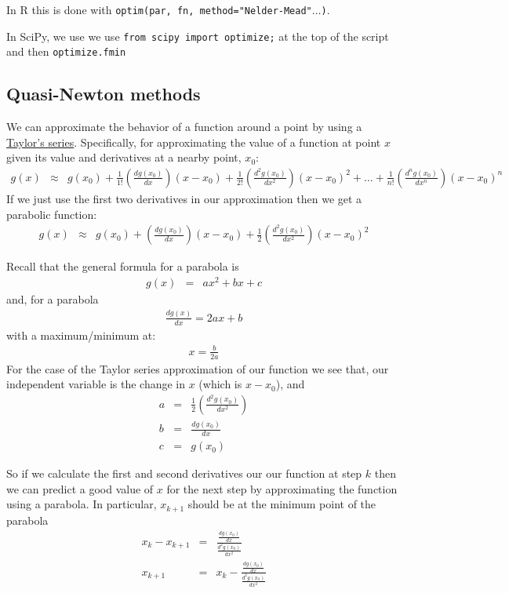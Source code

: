 \documentclass[11pt]{article}
\begin{document}
In R this is done with {\tt optim(par, fn, method="Nelder-Mead"$\ldots$)}.

In SciPy, we use we use {\tt from scipy import optimize;} at the top of the script and then {\tt optimize.fmin}

\subsection*{Quasi-Newton methods}

We can approximate the behavior of a function around a point by using a \href{http://en.wikipedia.org/wiki/Taylor%27s_theorem}{Taylor's  series}.
Specifically, for approximating the value of a function at point $x$ given its value and derivatives at a nearby point, $x_0$:
\begin{eqnarray*}\nonumber
	g(x) & \approx &g(x_0) + \frac{1}{1!}\left(\frac{d g(x_0)}{d x}\right)(x-x_0) + \frac{1}{2!}\left(\frac{d^2 g(x_0)}{d x^2}\right)(x-x_0)^2 + \ldots + \frac{1}{n!}\left(\frac{d^n g(x_0)}{d x^n}\right)(x-x_0)^n 
\end{eqnarray*}
If we just use the first two derivatives in our approximation then we get a parabolic function:
\begin{eqnarray*}\nonumber
	g(x) & \approx &g(x_0) + \left(\frac{d g(x_0)}{d x}\right)(x-x_0) + \frac{1}{2}\left(\frac{d^2 g(x_0)}{d x^2}\right)(x-x_0)^2
\end{eqnarray*}

Recall that the general formula for a parabola is 
\begin{eqnarray*}\nonumber
	g(x) & = & ax^2 + bx+c
\end{eqnarray*}
and, for a parabola
\begin{eqnarray*}\nonumber
	\frac{d g(x)}{d x} = 2 a x + b
\end{eqnarray*}
with a maximum/minimum at:
\begin{eqnarray*}\nonumber
	x = \frac{b}{2a}
\end{eqnarray*}
For the case of the Taylor series approximation of our function we see that, our independent variable is the change in $x$ (which is $x-x_0$), and  
\begin{eqnarray*}\nonumber
	a & = & \frac{1}{2}\left(\frac{d^2 g(x_0)}{d x^2}\right) \\
	b & = & \frac{d g(x_0)}{d x} \\
	c & = & g(x_0)
\end{eqnarray*}
	
So if we calculate the first and second derivatives our our function at step $k$ then we can predict a good value of $x$ for the next step by approximating the function using a parabola.
In particular, $x_{k+1}$ should be at the minimum point of the parabola
\begin{eqnarray*}\nonumber
	x_{k} - x_{k+1} & = & \frac{\frac{d g(x_0)}{d x}}{\frac{d^2 g(x_0)}{d x^2}}\\
	 x_{k+1} & = & x_{k} - \frac{\frac{d g(x_0)}{d x}}{\frac{d^2 g(x_0)}{d x^2}}\\
\end{eqnarray*}
\end{document}
